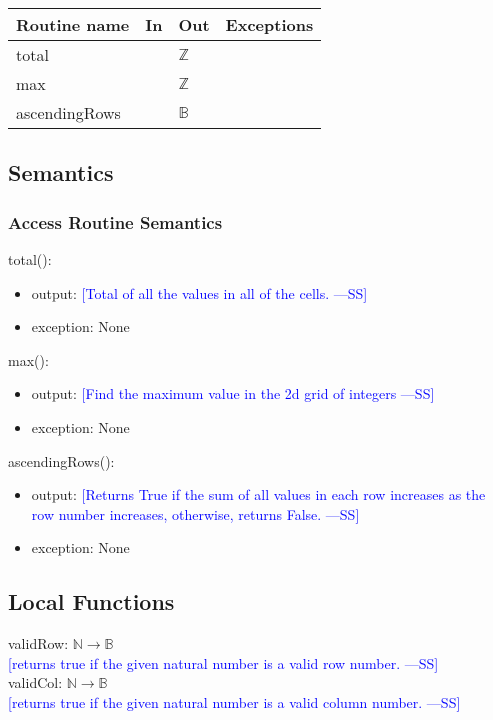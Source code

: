 \documentclass[12pt]{article}
\newcommand{\authornote}[3]{\textcolor{#1}{[#3 ---#2]}}
\newcommand{\authornote}[3]{}
\newcommand{\wss}[1]{\authornote{blue}{SS}{#1}}
\begin{document}
\begin{tabular}{| l | l | l | p{6cm} |}
\hline
\textbf{Routine name} & \textbf{In} & \textbf{Out} & \textbf{Exceptions}\\
\hline
total & & $\mathbb{Z}$ & \\
\hline
max &  & $\mathbb{Z}$ & \\
\hline
ascendingRows & & $\mathbb{B}$ & \\
\hline
\end{tabular}

\subsection* {Semantics}

\subsubsection* {Access Routine Semantics}

\noindent total():
\begin{itemize}
\item output: \wss{Total of all the values in all of the cells.}
\item exception: None
\end{itemize}

\noindent max():
\begin{itemize}
\item output: \wss{Find the maximum value in the 2d grid of integers}
\item exception: None
\end{itemize}

\noindent ascendingRows():
\begin{itemize}
\item output: \wss{Returns True if the sum of all values in each row increases
    as the row number increases, otherwise, returns False.}
\item exception: None
\end{itemize}

\subsection*{Local Functions}

\noindent validRow: $\mathbb{N} \rightarrow \mathbb{B}$\\
\noindent \wss{returns true if the given natural number is a valid row
  number.}\\

\noindent validCol: $\mathbb{N} \rightarrow \mathbb{B}$\\
\noindent \wss{returns true if the given natural number is a valid column
  number.}\\
\end{document}
